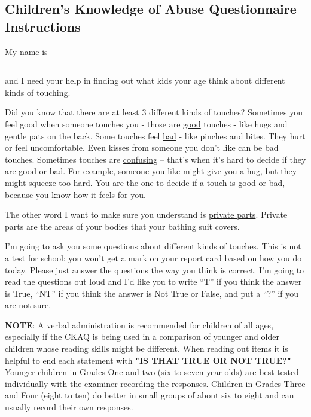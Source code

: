 
%

\begin{anexosenv}



\chapter{Children’s Knowledge of Abuse Questionnaire Instructions}\label{chap:CKAQInstrucoes}

My name is \rule{5.4cm}{0.15mm} and I need your help in finding out what kids your age think about different kinds of touching.

Did you know that there are at least 3 different kinds of touches? Sometimes you feel good when someone touches you - those are \underline{good} touches - like hugs and gentle pats on the back. Some touches feel \underline{bad} - like pinches and bites. They hurt or feel uncomfortable. Even kisses from someone you don’t like can be bad touches. Sometimes touches are \underline{confusing} – that’s when it’s hard to decide if they are good or bad. For example, someone you like might give you a hug, but they might squeeze too hard. You are the one to decide if a touch is good or bad, because you know how it feels for you.

The other word I want to make sure you understand is \underline{private parts}. Private parts are the areas of your bodies that your bathing suit covers. 

I’m going to ask you some questions about different kinds of touches. This is not a test for school: you won't get a mark on your report card based on how you do today. Please just answer the questions the way you think is correct. I’m going to read the questions out loud and I'd like you to write “T” if you think the answer is True, “NT” if you think the answer is Not True or False, and put a “?” if you are not sure. 

\textbf{NOTE}: A verbal administration is recommended for children of all ages, especially if the CKAQ is being used in a comparison of younger and older children whose reading skills might be different. When reading out items it is helpful to end each statement with \textbf{"IS THAT TRUE OR NOT TRUE?"} Younger children in Grades One and two (six to seven year olds) are best tested individually with the examiner recording the responses. Children in Grades Three and Four (eight to ten) do better in small groups of about six to eight and can usually record their own responses.


\end{anexosenv}

